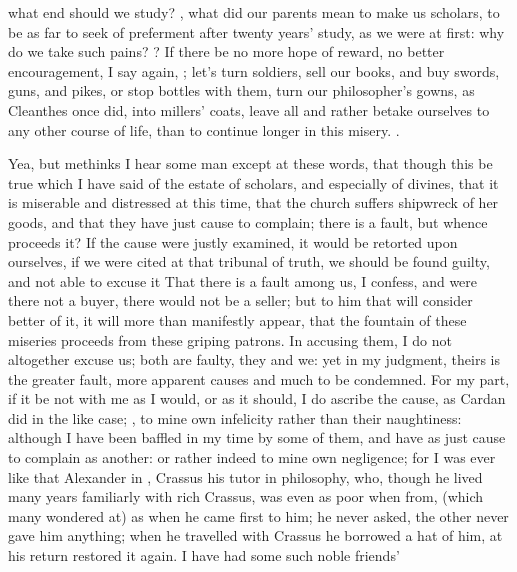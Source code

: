 what end should we study? , what did our parents mean to make us scholars, to be as far
to seek of preferment after twenty years' study, as we were at first: why do we
take such pains? ? If there
be no more hope of reward, no better encouragement, I say again, ; let's turn soldiers, sell our books,
and buy swords, guns, and pikes, or stop bottles with them, turn our
philosopher's gowns, as Cleanthes once did, into millers' coats, leave all and
rather betake ourselves to any other course of life, than to continue longer in
this misery. .

Yea, but methinks I hear some man except at these words, that though this be
true which I have said of the estate of scholars, and especially of divines,
that it is miserable and distressed at this time, that the church suffers
shipwreck of her goods, and that they have just cause to complain; there is a
fault, but whence proceeds it? If the cause were justly examined, it would be
retorted upon ourselves, if we were cited at that tribunal of truth, we should
be found guilty, and not able to excuse it That there is a fault among us, I
confess, and were there not a buyer, there would not be a seller; but to him
that will consider better of it, it will more than manifestly appear, that the
fountain of these miseries proceeds from these griping patrons. In accusing
them, I do not altogether excuse us; both are faulty, they and we: yet in my
judgment, theirs is the greater fault, more apparent causes and much to be
condemned. For my part, if it be not with me as I would, or as it should, I do
ascribe the cause, as Cardan did in the like case; , to mine own
infelicity rather than their naughtiness: although I have been baffled in my
time by some of them, and have as just cause to complain as another: or rather
indeed to mine own negligence; for I was ever like that Alexander in
\Plutarch{}, Crassus his tutor in philosophy, who, though he
lived many years familiarly with rich Crassus, was even as poor when from,
(which many wondered at) as when he came first to him; he never asked, the
other never gave him anything; when he travelled with Crassus he borrowed a hat
of him, at his return restored it again. I have had some such noble friends'
